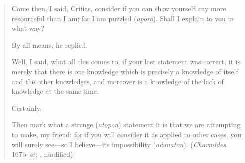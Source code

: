 \begin{quotation}
	Come then, I said, Critias, consider if you can show yourself any more resourceful than I am; for I am puzzled (\emph{aporō}). Shall I explain to you in what way?
	
	By all means, he replied.
	
	Well, I said, what all this comes to, if your last statement was correct, it is merely that there is one knowledge which is precisely a knowledge of itself and the other knowledges, and moreover is a knowledge of the lack of knowledge at the same time.
	
	Certainly.
	
	Then mark what a strange (\emph{atopon}) statement it is that we are attempting to make, my friend: for if you will consider it as applied to other cases, you will surely see—so I believe—its impossibility (\emph{adunaton}). (\emph{Charmides} 167b–sc; \citealt[57]{Lamb:1927qw}, modified)
\end{quotation}

